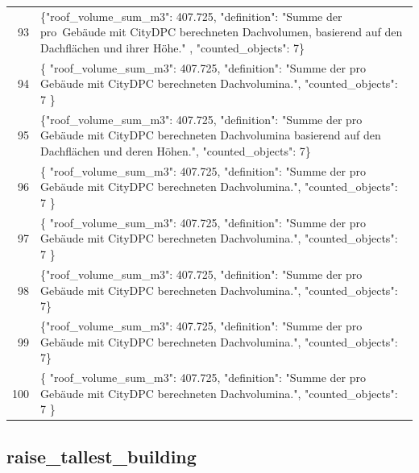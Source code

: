 \documentclass[a4paper,11pt]{article}
\begin{document}
\begin{table}[ht]
\begin{tabular}{r p{12cm}}
93 & \{"roof\_volume\_sum\_m3": 407.725, "definition": "Summe der pro Gebäude mit CityDPC berechneten Dachvolumen, basierend auf den Dachflächen und ihrer Höhe." , "counted\_objects": 7\} \\
94 & \{
  "roof\_volume\_sum\_m3": 407.725,
  "definition": "Summe der pro Gebäude mit CityDPC berechneten Dachvolumina.",
  "counted\_objects": 7
\} \\
95 & \{"roof\_volume\_sum\_m3": 407.725, "definition": "Summe der pro Gebäude mit CityDPC berechneten Dachvolumina basierend auf den Dachflächen und deren Höhen.", "counted\_objects": 7\} \\
96 & \{
  "roof\_volume\_sum\_m3": 407.725,
  "definition": "Summe der pro Gebäude mit CityDPC berechneten Dachvolumina.",
  "counted\_objects": 7
\} \\
97 & \{
  "roof\_volume\_sum\_m3": 407.725,
  "definition": "Summe der pro Gebäude mit CityDPC berechneten Dachvolumina.",
  "counted\_objects": 7
\} \\
98 & \{"roof\_volume\_sum\_m3": 407.725, "definition": "Summe der pro Gebäude mit CityDPC berechneten Dachvolumina.", "counted\_objects": 7\} \\
99 & \{"roof\_volume\_sum\_m3": 407.725, "definition": "Summe der pro Gebäude mit CityDPC berechneten Dachvolumina.", "counted\_objects": 7\} \\
100 & \{
  "roof\_volume\_sum\_m3": 407.725,
  "definition": "Summe der pro Gebäude mit CityDPC berechneten Dachvolumina.",
  "counted\_objects": 7
\} \\
\hline
\end{tabular}
\end{table}

\clearpage
\subsection{raise\_tallest\_building}
\end{document}
